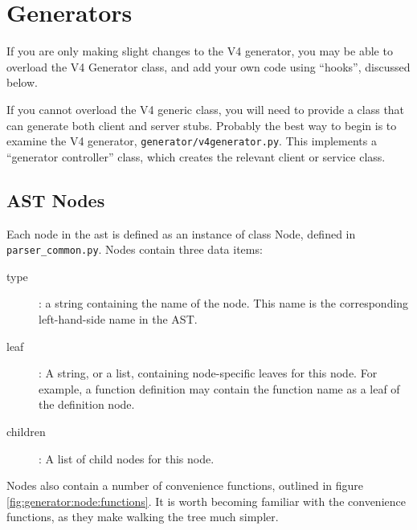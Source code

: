 \chapter{Generators}
\label{chapter:generators}

If you are only making slight changes to the V4 generator, you may be able to overload the V4 Generator class, and add your own code using ``hooks'', discussed below.

If you cannot overload the V4 generic class, you will need to provide a class that can generate both client and server stubs. Probably the best way to begin is to examine the V4 generator, {\tt generator/v4generator.py}. This implements a ``generator controller'' class, which creates the relevant client or service class.

\section{AST Nodes}
Each node in the ast is defined as an instance of class Node, defined in {\tt parser\_common.py}. Nodes contain three data items:

\begin{description}
\item[type]: a string containing the name of the node. This name is the corresponding left-hand-side name in the AST.
\item[leaf]: A string, or a list, containing node-specific leaves for this node. For example, a function definition may contain the function name as a leaf of the definition node.
\item[children]: A list of child nodes for this node.
\end{description}

Nodes also contain a number of convenience functions, outlined in figure \ref{fig:generator:node:functions}. It is worth becoming familiar with the convenience functions, as they make walking the tree much simpler.

